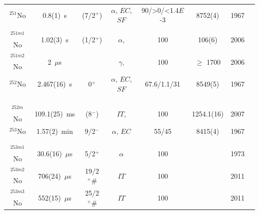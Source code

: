 \begin{center}
\begin{longtable}{c|ccccccl}
$^{251}$No	& 0.8(1)~s		&(7/2$^+$)  &$\alpha$, $EC$, $SF$&90/>0/<1.4$E$-3& 8752(4)		&1967	&{\tiny\cite{Ghiorso1967,Holden2000,Hessberger2001,Oganessian2001,Belozerov2003,Hessberger2004}}\\
			&				&			&					&			&				    &		&{\tiny\cite{Dragojevic2009,Lopez-Martens2022}}\\
$^{251m1}$No& 1.02(3)~s		& (1/2$^+$)	&$\alpha$,			&100		& 106(6)			&2006	&{\tiny\cite{Hessberger2001,Hessberger2006,Folden2009,Herzberg2011,Antalic2015,Lopez-Martens2022}}\\
$^{251m2}$No& 2~$\mu$s		&  			&$\gamma$,			&100		 & $\geq$ 1700		&2006	&{\tiny\cite{Hessberger2006,Folden2009,Herzberg2011,Antalic2015,Lopez-Martens2022}}\\
$^{252}$No	& 2.467(16)~s	&  0$^+$	&$\alpha$, $EC$, $SF$&67.6/1.1/31& 8549(5)			&1967	&{\tiny\cite{Mikheev1967a,Ghiorso1967,Oganessian1970,Flerov1976,Bemis1977a,Andreyev1993}}\\
			&				&			&					&			&				    &		&{\tiny\cite{Wild1994,Julin2001,Oganessian2001,Herzberg2001,Belozerov2003,Greenlees2005}}\\
			&				&			&					&			&				    &		&{\tiny\cite{Leppanen2006,Sulignano2007,Gates2011,Lopez-Martens2011,Svirikhin2012}}\\
			&				&			&					&			&				    &		&{\tiny\cite{Raeder2018,Kuznetsova2020,Isaev2021}}\\
$^{252m}$No	& 109.1(25)~ms	&  (8$^-$)	&$IT$,				&100		& 1254.1(16)	    &2007	&{\tiny\cite{Lazarev1989,Sulignano2007,Lopez-Martens2011}}\\
$^{253}$No	& 1.57(2)~min	&  9/2$^-$	&$\alpha$, $EC$		&55/45		& 8415(4)			&1967	&{\tiny\cite{Mikheev1967a,Ghiorso1967,Hessberger1997,Herzberg2002,Hessberger2004,Qian2009}}\\
			&				&			&					&			&				    &		&{\tiny\cite{Lopez-Martens2011,Hessberger2012,Rissanen2013,Hessberger2016,Mistry2017,Raeder2018}}\\
			&				&			&					&			&				    &		&{\tiny\cite{Hauschild2022}}\\
$^{253m1}$No& 30.6(16)~$\mu$s& 5/2$^+$	&$\alpha$           &100		& 				    &1973	&{\tiny\cite{Bemis1973,Lopez-Martens2007,Streicher2010,Antalic2011,Hauschild2022}}\\
$^{253m2}$No& 706(24)~$\mu$s& 19/2$^+ \#$&$IT$              &100		& 				    &2011	&{\tiny\cite{Lopez-Martens2011}}\\
$^{253m3}$No& 552(15)~$\mu$s& 25/2$^+ \#$&$IT$              &100		& 				    &2011	&{\tiny\cite{Lopez-Martens2011}}\\

\end{longtable}
\end{center}
